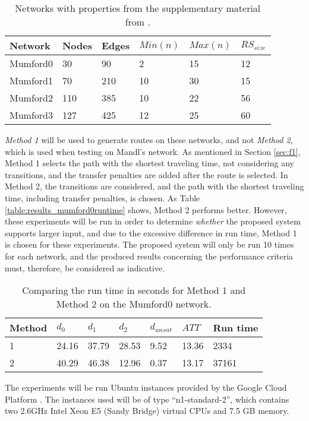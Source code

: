 \begin{table}[H]
	\centering
	\begin{tabular}{|l|l|l|l|l|l|}
    	\hline
    	\textbf{Network} & \textbf{Nodes}&\textbf{Edges} & $Min(n)$ & $Max(n)$ & $RS_{size}$\\
    	\hline
   	    Mumford0 & 30&90 & 2&15 & 12 \\
   	    Mumford1 & 70&210 & 10&30 & 15 \\
   	    Mumford2 & 110&385 & 10&22 & 56 \\
   	    Mumford3 & 127&425 & 12&25 & 60 \\
   	    \hline
    \end{tabular}
    \caption{Networks with properties from the supplementary material from \citet{mumford13}.}
    \label{table:dataSet_mumford}
\end{table}

\textit{Method 1} will be used to generate routes on these networks, and not \textit{Method 2}, which is used when testing on Mandl's network. As mentioned in Section \vref{sec:f1}, Method 1 selects the path with the shortest traveling time, not considering any transitions, and the transfer penalties are added after the route is selected. In Method 2, the transitions are considered, and the path with the shortest traveling time, including transfer penalties, is chosen. As Table \vref{table:results_mumford0runtime} shows, Method 2 performs better. However, these experiments will be run in order to determine \textit{whether} the proposed system supports larger input, and due to the excessive difference in run time, Method 1 is chosen for these experiments. The proposed system will only be run 10 times for each network, and the produced results concerning the performance criteria must, therefore, be considered as indicative. 

\begin{table}[H]
    \centering
    \begin{tabular}{|l|l|l|l|l|l|l|}
        \hline
        \textbf{Method} & $d_0$ & $d_1$ & $d_2$ & $d_{unsat}$ & $ATT$ & \textbf{Run time} \\
        \hline
        1 & 24.16 & 37.79 & 28.53 & 9.52 & 13.36 & 2334 \\
        2 & 40.29 & 46.38 & 12.96 & 0.37 & 13.17 & 37161 \\
        \hline
    \end{tabular}
    \caption{Comparing the run time in seconds for Method 1 and Method 2 on the Mumford0 network.}
    \label{table:results_mumford0runtime}
\end{table}

The experiments will be run Ubuntu instances provided by the Google Cloud Platform \citep{website:google}. The instances used will be of type ``n1-standard-2'', which contains two 2.6GHz Intel Xeon E5 (Sandy Bridge) virtual CPUs and 7.5 GB memory.

